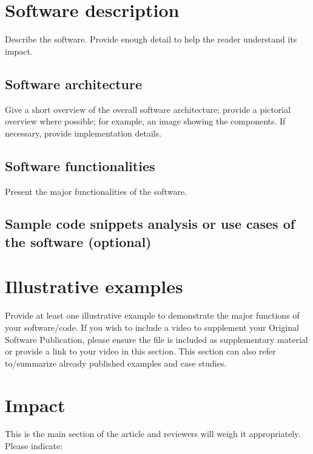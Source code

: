 \documentclass[preprint,12pt, a4paper]{elsarticle}
\begin{document}
\section{Software description}

Describe the software. Provide enough detail to help the reader understand
its impact.

\subsection{Software architecture}

Give a short overview of the overall software architecture; provide a
pictorial overview where possible; for example, an image showing the
components. If necessary, provide implementation details.

\subsection{Software functionalities}

Present the major functionalities of the software.

\subsection{Sample code snippets analysis or use cases of the software (optional)}

\section{Illustrative examples}

Provide at least one illustrative example to demonstrate the major functions
of your software/code. If you wish to include a video to supplement your
Original Software Publication, please ensure the file is included as
supplementary material or provide a link to your video in this
section.
This section can also refer to/summarize already published examples and case studies.

\section{Impact}

This is the main section of the article and reviewers will weigh it
appropriately. Please indicate:
\end{document}
